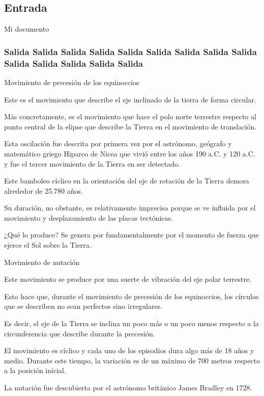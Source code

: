 \documentclass[12pt,a4paer]{article}
\begin{document}
\subsection{Entrada}

Mi documento

\subsubsection[Salida]{Salida Salida Salida Salida Salida Salida Salida Salida Salida Salida Salida Salida Salida Salida}%

Movimiento
 de precesión de los equinoccios

Este es el movimiento que describe el eje inclinado de la tierra de forma circular.

Más concretamente, es el movimiento que hace el polo norte terrestre respecto al punto central de la elipse 
que describe la Tierra en el movimiento de translación.

Esta oscilación fue descrita por primera vez por el astrónomo, geógrafo y matemático griego Hiparco de Nicea 
que vivió entre los años 190 a.C. y 120 a.C. y fue el tercer movimiento de la Tierra en ser detectado.

Este bamboleo cíclico en la orientación del eje de rotación de la Tierra demora alrededor de 25.780 años. 

Su duración, no obstante, es relativamente imprecisa porque se ve influida por el movimiento y desplazamiento 
de las placas tectónicas.

¿Qué lo produce? Se genera por fundamentalmente por el momento de fuerza que ejerce el Sol sobre la Tierra. 




Movimiento de nutación

Este movimiento se produce por una suerte de vibración del eje polar terrestre.

Esto hace que, durante el movimiento de precesión de los equinoccios, los círculos que se describen no sean 
perfectos sino irregulares.

Es decir, el eje de la Tierra se inclina un poco más o un poco menos respecto a la circunferencia que describe 
durante la precesión.

El movimiento es cíclico y cada uno de los episodios dura algo más de 18 años y medio. Durante este tiempo, 
la variación es de un máximo de 700 metros respecto a la posición inicial.

La nutación fue descubierta por el astrónomo británico James Bradley en 1728.
\end{document}
